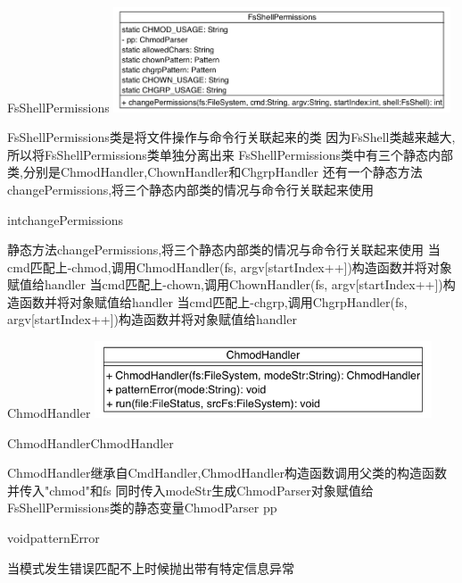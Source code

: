 \begin{XeClass}{FsShellPermissions}
\includegraphics[width=10cm]{cdig/FsShellPermissions.png}
     
 FsShellPermissions类是将文件操作与命令行关联起来的类
 因为FsShell类越来越大,所以将FsShellPermissions类单独分离出来
 FsShellPermissions类中有三个静态内部类,分别是ChmodHandler,ChownHandler和ChgrpHandler
 还有一个静态方法changePermissions,将三个静态内部类的情况与命令行关联起来使用

    \begin{XeMethod}{}{int}{changePermissions}
         
 静态方法changePermissions,将三个静态内部类的情况与命令行关联起来使用
 当cmd匹配上-chmod,调用ChmodHandler(fs, argv[startIndex++])构造函数并将对象赋值给handler
 当cmd匹配上-chown,调用ChownHandler(fs, argv[startIndex++])构造函数并将对象赋值给handler
 当cmd匹配上-chgrp,调用ChgrpHandler(fs, argv[startIndex++])构造函数并将对象赋值给handler

    \end{XeMethod}

    \begin{XeInnerClass}{ChmodHandler}
\includegraphics[width=10cm]{cdig/ChmodHandler.png}
        
        \begin{XeMethod}{}{ChmodHandler}{ChmodHandler}
             
 ChmodHandler继承自CmdHandler,ChmodHandler构造函数调用父类的构造函数并传入"chmod"和fs
 同时传入modeStr生成ChmodParser对象赋值给FsShellPermissions类的静态变量ChmodParser pp

        \end{XeMethod}

        \begin{XeMethod}{\XePrivate}{void}{patternError}
             
 当模式发生错误匹配不上时候抛出带有特定信息异常


\end{XeMethod}
\end{XeInnerClass}
\end{XeClass}
